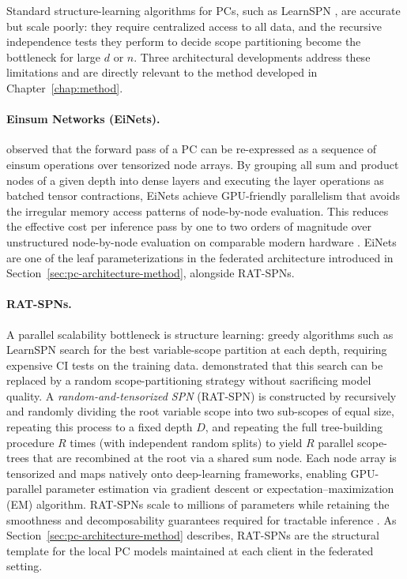 Standard structure-learning algorithms for PCs, such as LearnSPN
\cite{Gens2013LearningTS}, are accurate but scale poorly: they require centralized access to all data, and the recursive independence tests they perform to decide scope partitioning become the bottleneck for large $d$ or $n$.
Three architectural developments address these limitations and are directly relevant to the method developed in Chapter~\ref{chap:method}.

\paragraph{Einsum Networks (EiNets).}
\textcite{Peharz2020EinsumNF} observed that the forward pass of a PC can be re-expressed as a sequence of einsum operations over tensorized node arrays.
By grouping all sum and product nodes of a given depth into dense layers and executing the layer operations as batched tensor contractions, EiNets achieve GPU-friendly parallelism that avoids the irregular memory access patterns of
node-by-node evaluation.
This reduces the effective cost per inference pass by one to two orders of magnitude over unstructured node-by-node evaluation on comparable modern hardware \cite{Peharz2020EinsumNF}.
EiNets are one of the leaf parameterizations in the federated architecture introduced in Section~\ref{sec:pc-architecture-method}, alongside RAT-SPNs.

\paragraph{RAT-SPNs.}
A parallel scalability bottleneck is structure learning: greedy algorithms such as LearnSPN \cite{Gens2013LearningTS} search for the best variable-scope partition at each depth, requiring expensive CI tests on the training data.
\textcite{Peharz2019RandomSN} demonstrated that this search can be replaced by a random scope-partitioning strategy without sacrificing model quality.
A \emph{random-and-tensorized SPN} (RAT-SPN) is constructed by recursively and randomly dividing the root variable scope into two sub-scopes of equal size, repeating this process to a fixed depth $D$, and repeating the full tree-building procedure $R$ times (with independent random splits) to yield $R$ parallel scope-trees that are recombined at the root via a shared sum
node.
Each node array is tensorized and maps natively onto deep-learning frameworks, enabling GPU-parallel parameter estimation via gradient descent or expectation–maximization (EM) algorithm.
RAT-SPNs scale to millions of parameters while retaining the smoothness and decomposability guarantees required for tractable inference \cite{Peharz2019RandomSN}.
As Section~\ref{sec:pc-architecture-method} describes, RAT-SPNs are the structural template for the local PC models maintained at each client in the federated setting.

